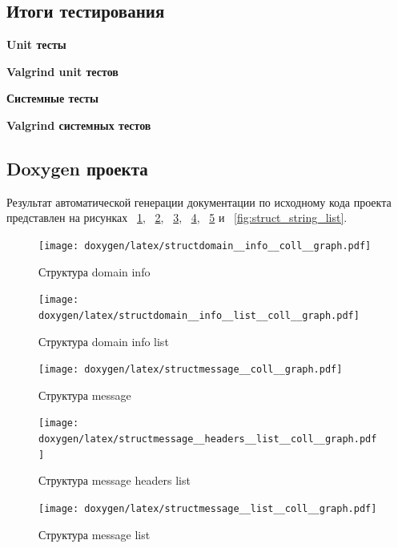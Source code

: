 \documentclass[a4paper,12pt]{article}
\begin{document}
\subsection{Итоги тестирования}

\textbf{Unit тесты}

\textbf{Valgrind unit тестов}

\textbf{Системные тесты}

\textbf{Valgrind системных тестов}

\subsection{Doxygen проекта}

Результат автоматической генерации документации по исходному кода проекта представлен на рисунках ~\ref{fig:struct_domain_info},
~\ref{fig:struct_domain_info_list}, ~\ref{fig:struct_message}, ~\ref{fig:struct_message_headers_list}, ~\ref{fig:struct_message_list} 
и ~\ref{fig:struct_string_list}.

\begin{figure}[h]
\centering
\texttt{[image: doxygen/latex/structdomain\_\_info\_\_coll\_\_graph.pdf]}
\caption{Структура domain info}
\label{fig:struct_domain_info}
\end{figure}

\begin{figure}[h]
\centering
\texttt{[image: doxygen/latex/structdomain\_\_info\_\_list\_\_coll\_\_graph.pdf]}
\caption{Структура domain info list}
\label{fig:struct_domain_info_list}
\end{figure}

\begin{figure}[h]
\centering
\texttt{[image: doxygen/latex/structmessage\_\_coll\_\_graph.pdf]}
\caption{Структура message}
\label{fig:struct_message}
\end{figure}

\begin{figure}[h]
\centering
\texttt{[image: doxygen/latex/structmessage\_\_headers\_\_list\_\_coll\_\_graph.pdf]}
\caption{Структура message headers list}
\label{fig:struct_message_headers_list}
\end{figure}

\begin{figure}[h]
\centering
\texttt{[image: doxygen/latex/structmessage\_\_list\_\_coll\_\_graph.pdf]}
\caption{Структура message list}
\label{fig:struct_message_list}
\end{figure}
\end{document}
